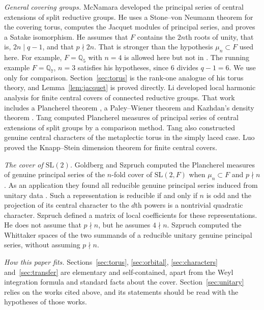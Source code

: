 \documentclass[12pt,letterpaper]{article}
\numberwithin{equation}{section}
\theoremstyle{plain}
\theoremstyle{definition}
\theoremstyle{remark}
\newcommand{\Qq}{\mathbb Q}
\newcommand{\SL}{\mathrm{SL}}
\begin{document}
\emph{General covering groups.} McNamara \cite{Mc12} developed the
principal series of central extensions of split reductive groups. He
uses a Stone--von Neumann theorem for the covering torus, computes the
Jacquet modules of principal series, and proves a Satake isomorphism.
He assumes that $F$ contains the $2n$th roots of unity, that is,
$2n\mid q-1$, and that $p\nmid 2n$. That is stronger than the
hypothesis $\mu_n\subset F$ used here. For example, $F=\Qq_5$ with
$n=4$ is allowed here but not in \cite{Mc12}. The running example
$F=\Qq_7$, $n=3$ satisfies his hypotheses, since $6$ divides $q-1=6$.
We use \cite{Mc12} only for comparison. Section~\ref{sec:torus} is the
rank-one analogue of his torus theory, and Lemma~\ref{lem:jacquet} is
proved directly. Li \cite{Li12} developed local harmonic analysis for
finite central covers of connected reductive groups. That work
includes a Plancherel theorem \cite[Thm.~2.6.4]{Li12}, a Paley--Wiener
theorem \cite[Thm.~5.6.3]{Li12} and Kazhdan's density theorem
\cite[Thm.~5.8.10]{Li12}. Tang \cite{Ta17} computed Plancherel measures
of principal series of central extensions of split groups by a
comparison method. Tang also constructed genuine central characters of
the metaplectic torus in the simply laced case. Luo \cite{Lu20} proved
the Knapp--Stein dimension theorem for finite central covers.

\emph{The cover of $\SL(2)$.} Goldberg and Szpruch \cite{GS16}
computed the Plancherel measures of genuine principal series of the
$n$-fold cover of $\SL(2,F)$ when $\mu_n\subset F$ and $p\nmid n$. As
an application they found all reducible genuine principal series
induced from unitary data \cite[Thm.~5.2]{GS16}. Such a representation
is reducible if and only if $n$ is odd and the projection of its
central character to the $d$th powers is a nontrivial quadratic
character. Szpruch \cite{Sz19} defined a matrix of local coefficients
for these representations. He does not assume that $p\nmid n$, but he
assumes $4\nmid n$. Szpruch \cite{Sz25} computed the Whittaker spaces of
the two summands of a reducible unitary genuine principal series,
without assuming $p\nmid n$.

\emph{How this paper fits.} Sections~\ref{sec:torus},
\ref{sec:orbital}, \ref{sec:characters} and~\ref{sec:transfer} are
elementary and self-contained, apart from the Weyl integration formula
and standard facts about the cover. Section~\ref{sec:unitary} relies
on the works cited above, and its statements should be read with the
hypotheses of those works.
\end{document}
